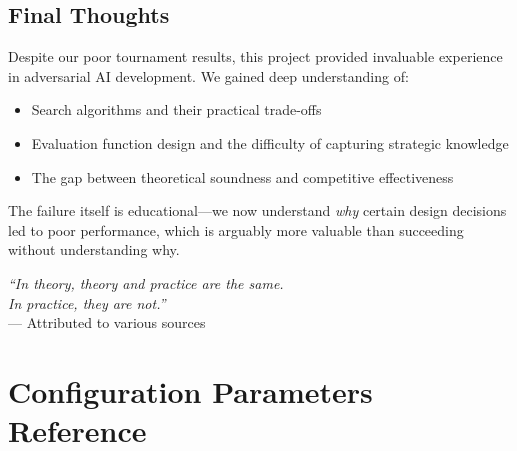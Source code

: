 \documentclass[11pt,a4paper]{article}
\begin{document}
\subsection{Final Thoughts}

Despite our poor tournament results, this project provided invaluable experience in adversarial AI development. We gained deep understanding of:
\begin{itemize}
    \item Search algorithms and their practical trade-offs
    \item Evaluation function design and the difficulty of capturing strategic knowledge
    \item The gap between theoretical soundness and competitive effectiveness
\end{itemize}

The failure itself is educational---we now understand \emph{why} certain design decisions led to poor performance, which is arguably more valuable than succeeding without understanding why.

\vspace{1cm}
\begin{center}
\textit{``In theory, theory and practice are the same.\\In practice, they are not.''}\\
--- Attributed to various sources
\end{center}

\appendix
\newpage

\section{Configuration Parameters Reference}
\end{document}
